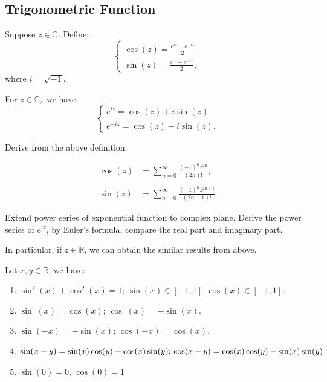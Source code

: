 \documentclass[12pt]{article}
\begin{document}
\subsection*{Trigonometric Function}

\begin{definition}
    Suppose $z\in\mathbb{C}$. Define:
    \[
    \begin{cases}
        \cos(z)=\frac{e^{iz}+e^{-iz}}{2}\\
        \sin(z)=\frac{e^{iz}-e^{-iz}}{2},
    \end{cases}
    \]
    where \(i=\sqrt{-1}\).
\label{tri_exp_def}
\end{definition}

\begin{theorem}
    For $z\in\mathbb{C},$ we have:
    \[
    \begin{cases}
     e^{iz}=\cos(z)+i\sin(z)\\
     e^{-iz}=\cos(z)-i\sin(z).    
    \end{cases}
    \]
\end{theorem}

\begin{pfbox}
    Derive from the above definition.
\end{pfbox}

\begin{theorem}
    \begin{equation*}
    \begin{split}
        \cos(z)&=\sum_{n=0}^{\infty}\frac{(-1)^n z^{2n}}{(2n)!},\\
        \\
        \sin(z)&=\sum_{n=0}^{\infty}\frac{(-1)^n z^{2n+1}}{(2n+1)!}
    \end{split}
    \end{equation*}
\label{tri_power_series}
\end{theorem}

\begin{pfbox}
    Extend power series of exponential function to complex plane.
    Derive the power series of $e^{iz}$, by Euler's formula, compare the real part and imaginary part.
\end{pfbox}

In particular, if $z\in\mathbb{R}$, we can obtain the similar results from above.

\begin{property}
Let $x,y\in\mathbb{R}$, we have:
\begin{enumerate}
    \item $\sin^2(x) + \cos^2(x) = 1;\, \sin(x)\in [-1,1], \cos(x)\in [-1,1]$.
    \item $\sin^\prime(x)=\cos(x);\, \cos^\prime (x) = -\sin(x)$.
    \item $\sin(-x)=-\sin(x);\, \cos(-x)=\cos(x)$.
    \item $\sin(x+y)=\sin(x)\cos(y)+\cos(x)\sin(y);\\
           \cos(x+y)=\cos(x)\cos(y)-\sin(x)\sin(y)$ 
    \item $\sin(0)=0, \, \cos(0)=1$
\end{enumerate}
\end{property}
\end{document}
